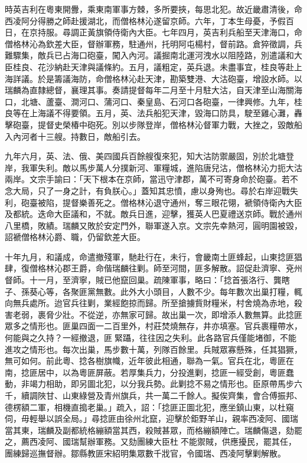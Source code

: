 \begin{pinyinscope}
時英吉利在粵東開釁，乘東南軍事方棘，多所要挾，每思北犯。故近畿肅清後，命西凌阿分得勝之師赴援湖北，而僧格林沁遂留京師。六年，丁本生母憂，予假百日，在京持服。尋調正黃旗領侍衛內大臣。七年四月，英吉利兵船至天津海口，命僧格林沁為欽差大臣，督辦軍務，駐通州，托明阿屯楊村，督前路。倉猝徵調，兵難驟集，敵兵已占海口砲臺，闖入內河。議掘南北運河洩水以阻陸路，別遣議和大臣桂良、花沙納赴天津與議條約。五月，議粗定，英兵退。未盡事宜，桂良等赴上海詳議。於是籌議海防，命僧格林沁赴天津，勘築雙港、大沽砲臺，增設水師。以瑞麟為直隸總督，襄理其事。奏請提督每年二月至十月駐大沽，自天津至山海關海口，北塘、蘆臺、澗河口、蒲河口、秦皇島、石河口各砲臺，一律興修。九年，桂良等在上海議不得要領。五月，英、法兵船犯天津，毀海口防具，駛至雞心灘，轟擊砲臺，提督史榮椿中砲死。別以步隊登岸，僧格林沁督軍力戰，大挫之，毀敵船入內河者十三艘。持數日，敵船引去。

九年六月，英、法、俄、美四國兵百餘艘復來犯，知大沽防禦嚴固，別於北塘登岸，我軍失利。敵以馬步萬人分撲新河、軍糧城，進陷唐兒沽，僧格林沁力扼大沽兩岸。文宗手諭曰：「天下根本在京師，當迅守津郡，萬不可寄身命於砲臺。若不念大局，只了一身之計，有負朕心。」蓋知其忠憤，慮以身殉也。尋於右岸迎戰失利，砲臺被陷，提督樂善死之。僧格林沁退守通州，奪三眼花翎，褫領侍衛內大臣及都統。迭命大臣議和，不就。敵兵日進，迎擊，獲英人巴夏禮送京師。戰於通州八里橋，敗績。瑞麟又敗於安定門外，聯軍遂入京。文宗先幸熱河，圓明園被毀，詔褫僧格林沁爵、職，仍留欽差大臣。

十年九月，和議成，命遣撤殘軍，馳赴行在，未行，會畿南土匪蜂起，山東捻匪猖肆，復僧格林沁郡王爵，命偕瑞麟往剿。師至河間，匪多解散。詔促赴濟寧、兗州督師。十一月，至濟寧，賊已他竄回巢。疏陳軍事，略曰：「捻首張洛行、龔瞎子、孫葵心等，各聚匪黨無數。此外大小頭目，人數不少。每年數次出巢打糧，輒向無兵處所。迨官兵往剿，業經飽掠而歸。所至搶擄貲財糧米，村舍燒為赤地，殺害老弱，裹脅少壯。不從逆，亦無家可歸。故出巢一次，即增添人數無算。此捻匪眾多之情形也。匪巢四面一二百里外，村莊焚燒無存，井亦填塞。官兵裹糧帶水，何能與之久持？一經撤退，匪緊躡，往往因之失利。此各路官兵僅能堵御，不能進攻之情形也。每次出巢，馬步數十萬，列隊百餘里。兵賊眾寡懸殊，任其猖獗，無可如何。前此粵、捻各樹旗幟，近年彼此相通，聯為一氣。官兵在北，粵匪在南，捻匪居中，以為粵匪屏蔽。若厚集兵力，分投進剿，捻匪一經受創，粵匪蠢動，非竭力相助，即另圖北犯，以分我兵勢。此剿捻不易之情形也。臣原帶馬步六千，續調陜甘、山東綠營及青州旗兵，共一萬二千餘人。擬俟齊集，會合傅振邦、德楞額二軍，相機直搗老巢。」疏入，詔：「捻匪正圖北犯，應坐鎮山東，以杜窺伺，毋輕舉以誤全局。」尋捻匪由徐州北竄，迎擊於鉅野羊山，親率西凌阿、國瑞當其東，瑞麟及副都統格繃額當其西，殺賊甚眾，而格繃額陣亡。瑞麟傷退，劾罷之，薦西凌阿、國瑞幫辦軍務。又劾團練大臣杜不能禦賊，供應擾民，罷其任，團練歸巡撫督辦。鄒縣教匪宋紹明集眾數千戕官，令國瑞、西凌阿擊剿解散。


\end{pinyinscope}
